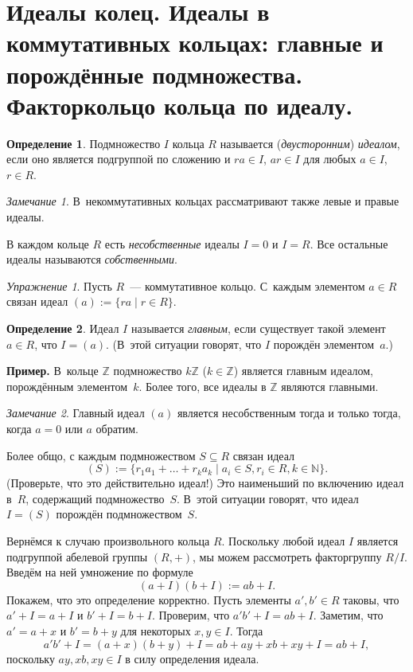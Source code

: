 \documentclass[a4paper, 12pt]{article}
\def\ZZ{{\mathbb Z}}%
\def\NN{{\mathbb N}}%
\theoremstyle{definition}
\newtheorem{definition}{Определение}
\theoremstyle{remark}
\newtheorem{exercise}{Упражнение}
\newtheorem{remark}{Замечание}
\begin{document}
\section{Идеалы колец. Идеалы в коммутативных кольцах: главные и порождённые подмножества. Факторкольцо кольца по идеалу.}

\begin{definition}
Подмножество $I$ кольца $R$ называется (\textit{двусторонним}) {\it
идеалом}, если оно является подгруппой по сложению и $ra\in I$,
$ar\in I$ для любых $a\in I$, $r\in R$.
\end{definition}

\begin{remark}
В~некоммутативных кольцах рассматривают также левые и правые идеалы.
\end{remark}

В каждом кольце $R$ есть {\it несобственные} идеалы $I=0$ и $I=R$.
Все остальные идеалы называются {\it собственными}.

\begin{exercise}
Пусть $R$~--- коммутативное кольцо. С~каждым элементом $a \in R$
связан идеал $(a) := \{ ra \mid r \in R \}$.
\end{exercise}

\begin{definition}
Идеал $I$ называется {\it главным}, если существует такой элемент
$a\in R$, что $I=(a)$. (В~этой ситуации говорят, что $I$ порождён
элементом~$a$.)
\end{definition}

\textbf{Пример.} В~кольце $\ZZ$ подмножество $k \ZZ$ ($k \in \ZZ$)
является главным идеалом, порождённым элементом~$k$. Более того, все
идеалы в $\ZZ$ являются главными.

\begin{remark}
Главный идеал $(a)$ является несобственным тогда и только тогда,
когда $a=0$ или $a$ обратим.
\end{remark}

Более общо, с каждым подмножеством $S \subseteq R$ связан идеал
$$
(S) := \{ r_1 a_1 + \ldots + r_k a_k \mid a_i \in S, r_i \in R,
k\in\NN\}.
$$
(Проверьте, что это действительно идеал!) Это наименьший по
включению идеал в~$R$, содержащий подмножество~$S$. В~этой ситуации
говорят, что идеал $I=(S)$ порождён подмножеством~$S$.

Вернёмся к случаю произвольного кольца $R$. Поскольку любой идеал
$I$ является подгруппой абелевой группы $(R,+)$, мы можем
рассмотреть факторгруппу $R/I$. Введём на ней умножение по формуле
$$
(a+I)(b+I) := ab + I.
$$
Покажем, что это определение корректно. Пусть элементы $a',b' \in R$
таковы, что $a' + I = a + I$ и $b' + I = b + I$. Проверим, что $a'b'
+ I = ab + I$. Заметим, что $a' = a + x$ и $b' = b + y$ для
некоторых $x, y \in I$. Тогда
$$
a'b' + I = (a + x)(b + y) + I = ab + ay + xb + xy + I = ab + I,
$$
поскольку $ay, xb, xy \in I$ в силу определения идеала.
\end{document}
